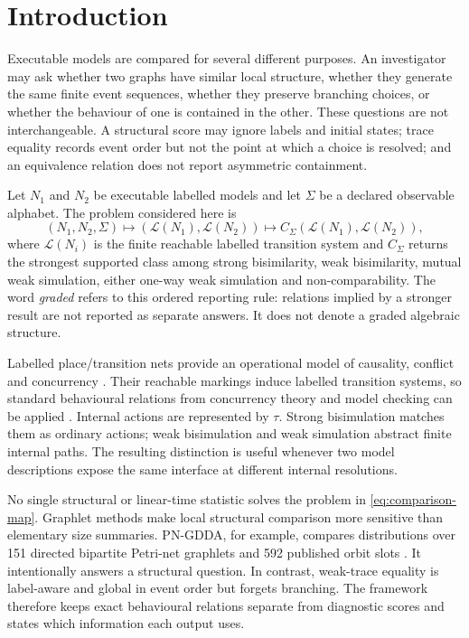 \documentclass[JMCS,submit]{resources/ISRP}
\theoremstyle{definition}
\theoremstyle{remark}
\numberwithin{equation}{section}
\newcommand{\TAU}{\tau}
\newcommand{\LTS}{\mathcal{L}}
\begin{document}
\maketitle

\section{Introduction}\label{sec:introduction}

Executable models are compared for several different purposes. An investigator
may ask whether two graphs have similar local structure, whether they generate the
same finite event sequences, whether they preserve branching choices, or whether
the behaviour of one is contained in the other. These questions are not
interchangeable. A structural score may ignore labels and initial states; trace
equality records event order but not the point at which a choice is resolved; and
an equivalence relation does not report asymmetric containment.

Let $N_1$ and $N_2$ be executable labelled models and let $\Sigma$ be a declared
observable alphabet. The problem considered here is
\begin{equation}\label{eq:comparison-map}
 (N_1,N_2,\Sigma)
 \longmapsto (\LTS(N_1),\LTS(N_2))
 \longmapsto C_{\Sigma}(\LTS(N_1),\LTS(N_2)),
\end{equation}
where $\LTS(N_i)$ is the finite reachable labelled transition system and
$C_{\Sigma}$ returns the strongest supported class among strong bisimilarity,
weak bisimilarity, mutual weak simulation, either one-way weak simulation and
non-comparability. The word \emph{graded} refers to this ordered reporting rule:
relations implied by a stronger result are not reported as separate answers. It
does not denote a graded algebraic structure.

Labelled place/transition nets provide an operational model of causality,
conflict and concurrency \cite{Murata1989}. Their reachable markings induce
labelled transition systems, so standard behavioural relations from concurrency
theory and model checking can be applied \cite{Milner1989,BaierKatoen2008,
Sangiorgi2011}. Internal actions are represented by $\TAU$. Strong bisimulation
matches them as ordinary actions; weak bisimulation and weak simulation abstract
finite internal paths. The resulting distinction is useful whenever two model
descriptions expose the same interface at different internal resolutions.

No single structural or linear-time statistic solves the problem in
\eqref{eq:comparison-map}. Graphlet methods make local structural comparison more
sensitive than elementary size summaries. PN-GDDA, for example, compares
distributions over 151 directed bipartite Petri-net graphlets and 592 published
orbit slots \cite{Szawulak2022}. It intentionally answers a structural question.
In contrast, weak-trace equality is label-aware and global in event order but
forgets branching. The framework therefore keeps exact behavioural relations
separate from diagnostic scores and states which information each output uses.
\end{document}
